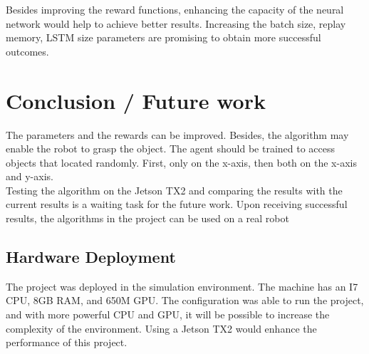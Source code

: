 \documentclass[10pt,journal,compsoc]{IEEEtran}
\begin{document}
Besides improving the reward functions, enhancing the capacity of the neural network would help to achieve better results. Increasing the batch size, replay memory, LSTM size parameters are promising to obtain more successful outcomes.

\section{Conclusion / Future work}
The parameters and the rewards can be improved. Besides, the algorithm may enable the robot to grasp the object. The agent should be trained to access objects that located randomly. First, only on the x-axis, then both on the x-axis and y-axis.\\
Testing the algorithm on the Jetson TX2 and comparing the results with the current results is a waiting task for the future work. Upon receiving successful results, the algorithms in the project can be used on a real robot

\subsection{Hardware Deployment}
The project was deployed in the simulation environment. The machine has an I7 CPU, 8GB RAM, and 650M GPU. The configuration was able to run the project, and with more powerful CPU and GPU, it will be possible to increase the complexity of the environment. Using a Jetson TX2 would enhance the performance of this project.



\end{document}
